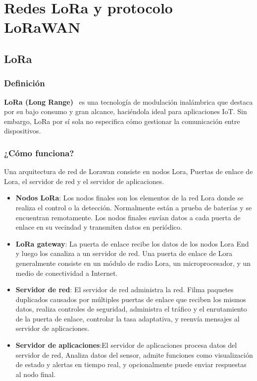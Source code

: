 \section{Redes LoRa y protocolo LoRaWAN}

\subsection{LoRa}

\subsubsection{Definición}

\textbf{LoRa (Long Range)}~\cite{Moko:Lora} es una tecnología de modulación inalámbrica que destaca por su bajo consumo y gran alcance, haciéndola ideal para aplicaciones IoT. Sin embargo, LoRa por sí sola no especifica cómo gestionar la comunicación entre dispositivos.

\subsubsection{¿Cómo funciona?}
Una arquitectura de red de Lorawan consiste en nodos Lora, Puertas de enlace de Lora, el servidor de red y el servidor de aplicaciones.


\begin{itemize}
   \item \textbf{Nodos LoRa}: Los nodos finales son los elementos de la red Lora donde se realiza el control o la detección. Normalmente están a prueba de baterías y se encuentran remotamente. Los nodos finales envían datos a cada puerta de enlace en su vecindad y transmiten datos en periódico.
    \item \textbf{LoRa gateway}: La puerta de enlace recibe los datos de los nodos Lora End y luego los canaliza a un servidor de red. Una puerta de enlace de Lora generalmente consiste en un módulo de radio Lora, un microprocesador, y un medio de conectividad a Internet.
    \item \textbf{Servidor de red}: El servidor de red administra la red. Filma paquetes duplicados causados por múltiples puertas de enlace que reciben los mismos datos, realiza controles de seguridad, administra el tráfico y el enrutamiento de la puerta de enlace, controlar la tasa adaptativa, y reenvía mensajes al servidor de aplicaciones.
    \item \textbf{Servidor de aplicaciones}:El servidor de aplicaciones procesa datos del servidor de red, Analiza datos del sensor, admite funciones como visualización de estado y alertas en tiempo real, y opcionalmente puede enviar respuestas al nodo final.
\end{itemize}

